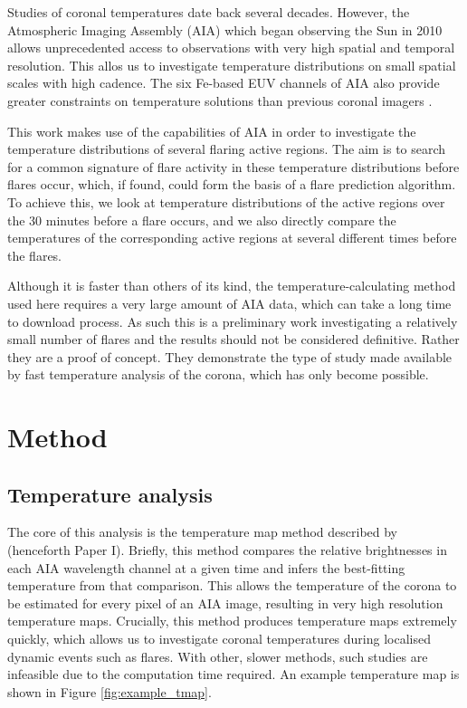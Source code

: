 \documentclass[referee,a4paper,12pt]{swsc}
\begin{document}
\begin{linenumbers}
Studies of coronal temperatures date back several decades. %
However, the Atmospheric Imaging Assembly (AIA) \citep{Lemen2011} which began observing the Sun in 2010 allows unprecedented access to observations with very high spatial and temporal resolution.
This allos us to investigate temperature distributions on small spatial scales with high cadence. %
The six Fe-based EUV channels of AIA also provide greater constraints on temperature solutions than previous coronal imagers \citep{Guennou2012, Guennou2012a}.

This work makes use of the capabilities of AIA in order to investigate the temperature distributions of several flaring active regions.
The aim is to search for a common signature of flare activity in these temperature distributions before flares occur, which, if found, could form the basis of a flare prediction algorithm.
To achieve this, we look at temperature distributions of the active regions over the 30 minutes before a flare occurs, and we also directly compare the temperatures of the corresponding active regions at several different times before the flares.

Although it is faster than others of its kind, the temperature-calculating method used here requires a very large amount of AIA data, which can take a long time to download process.
As such this is a preliminary work investigating a relatively small number of flares and the results should not be considered definitive.
Rather they are a proof of concept.
They demonstrate the type of study made available by fast temperature analysis of the corona, which has only become possible. %

\section{Method}
\subsection{Temperature analysis}
The core of this analysis is the temperature map method described by \cite{Leonard} (henceforth Paper I).
Briefly, this method compares the relative brightnesses in each AIA wavelength channel at a given time and infers the best-fitting temperature from that comparison. %
This allows the temperature of the corona to be estimated for every pixel of an AIA image, resulting in very high resolution temperature maps.
Crucially, this method produces temperature maps extremely quickly, which allows us to investigate coronal temperatures during localised dynamic events such as flares.
With other, slower methods, such studies are infeasible due to the computation time required.
An example temperature map is shown in Figure \ref{fig:example_tmap}.


\end{linenumbers}
\end{document}
